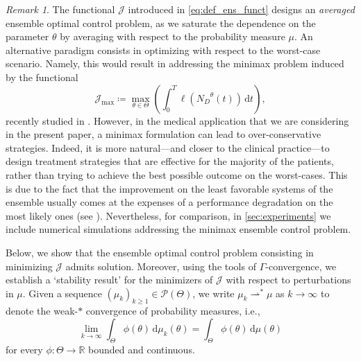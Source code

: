 \documentclass[a4paper,12pt, reqno]{amsart}
\theoremstyle{plain}
\theoremstyle{definition}
\theoremstyle{remark}
\newtheorem{remark}{Remark}
\numberwithin{equation}{section}
\newcommand{\J}{\mathcal{J}}
\newcommand{\R}{\mathbb{R}}
\newcommand{\weak}{\rightharpoonup}
\newcommand{\de}{\,\mathrm{d}}
\begin{document}
\begin{remark}
    The functional $\J$ introduced in \cref{eq:def_ens_funct} designs an \emph{averaged} ensemble optimal control problem, as we saturate the dependence on the parameter $\theta$ by averaging with respect to the probability measure $\mu$. 
    An alternative paradigm consists in optimizing with respect to the worst-case scenario. Namely, this would result in addressing the minimax problem induced by the functional
    \begin{equation} \label{eq:def_Funct_minimax}
        \J_{\max} \coloneqq 
        \max_{\theta \in \Theta} \left(
        \int_0^T \ell\left({N_D}^\theta({t} )\right)  
    \de {t} \right),
    \end{equation}
    recently studied in \cite{Scag25}.
    However, in the medical application that we are considering in the present paper, a minimax formulation can lead to over-conservative strategies.
    Indeed, it is more natural---and closer to the clinical practice---to design treatment strategies that are effective for the majority of the patients, rather than trying to achieve the best possible outcome on the worst-cases. This is due to the fact that the improvement on the least favorable systems of the ensemble usually comes at the expenses of a performance degradation on the most likely ones (see \cite[Section~6]{Scag25}).
    {Nevertheless, for comparison, in \cref{sec:experiments} we include numerical simulations addressing the minimax ensemble control problem.}
\end{remark}


Below, we show that the ensemble optimal control problem consisting in minimizing $\J$ admits solution. Moreover, using the tools of $\Gamma$-convergence, we establish a `stability result' for the minimizers of $\J$ with respect to perturbations in $\mu$. 
Given a sequence $(\mu_{k})_{{k}\geq1}\in\mathcal{P}(\Theta)$, we write $\mu_{k}\weak^* \mu$ as ${k}\to\infty$ to denote the weak-$*$ convergence of probability measures, i.e., 
\begin{equation*}
    \lim_{{k}\to\infty} \int_\Theta \phi(\theta)\de \mu_{k}(\theta) = 
    \int_\Theta \phi(\theta)\de \mu(\theta)
\end{equation*}
for every $\phi:\Theta\to\R$ bounded and continuous.
\end{document}
